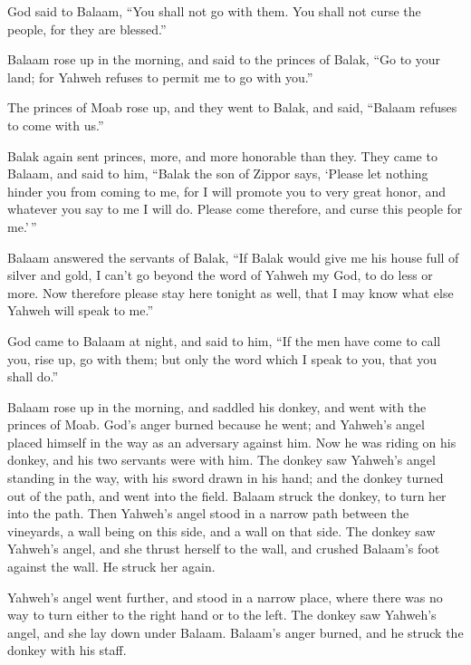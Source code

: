  God said to Balaam, ``You shall not go with them. You
shall not curse the people, for they are blessed.''

 Balaam rose up in the morning, and said to the princes
of Balak, ``Go to your land; for Yahweh refuses to permit me to go with
you.''

 The princes of Moab rose up, and they went to Balak, and
said, ``Balaam refuses to come with us.''

 Balak again sent princes, more, and more honorable than
they.  They came to Balaam, and said to him, ``Balak the
son of Zippor says, `Please let nothing hinder you from coming to me,
 for I will promote you to very great honor, and whatever
you say to me I will do. Please come therefore, and curse this people
for me.'\,''

 Balaam answered the servants of Balak, ``If Balak would
give me his house full of silver and gold, I can't go beyond the word of
Yahweh my God, to do less or more.  Now therefore please
stay here tonight as well, that I may know what else Yahweh will speak
to me.''

 God came to Balaam at night, and said to him, ``If the
men have come to call you, rise up, go with them; but only the word
which I speak to you, that you shall do.''

 Balaam rose up in the morning, and saddled his donkey,
and went with the princes of Moab.  God's anger burned
because he went; and Yahweh's angel placed himself in the way as an
adversary against him. Now he was riding on his donkey, and his two
servants were with him.  The donkey saw Yahweh's angel
standing in the way, with his sword drawn in his hand; and the donkey
turned out of the path, and went into the field. Balaam struck the
donkey, to turn her into the path.  Then Yahweh's angel
stood in a narrow path between the vineyards, a wall being on this side,
and a wall on that side.  The donkey saw Yahweh's angel,
and she thrust herself to the wall, and crushed Balaam's foot against
the wall. He struck her again.

 Yahweh's angel went further, and stood in a narrow
place, where there was no way to turn either to the right hand or to the
left.  The donkey saw Yahweh's angel, and she lay down
under Balaam. Balaam's anger burned, and he struck the donkey with his
staff.

